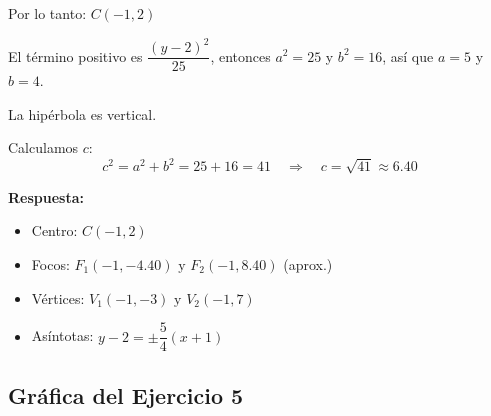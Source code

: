 \documentclass[12pt,a4paper]{article}
\begin{document}
	Por lo tanto: $\boxed{C(-1,2)}$

	\bigskip

	El término positivo es $\dfrac{(y-2)^2}{25}$, entonces $a^2=25$ y $b^2=16$, así que $a=5$ y $b=4$.

	\bigskip

	La hipérbola es vertical.

	\bigskip

	Calculamos $c$:
	\[
	c^2=a^2+b^2=25+16=41 \quad\Rightarrow\quad c=\sqrt{41}\approx 6.40
	\]

	\textbf{Respuesta:}
	\begin{itemize}
		\item Centro: $\boxed{C(-1,2)}$
		\item Focos: $\boxed{F_1(-1,-4.40)\text{ y }F_2(-1,8.40)}$ (aprox.)
		\item Vértices: $\boxed{V_1(-1,-3)\text{ y }V_2(-1,7)}$
		\item Asíntotas: $y-2=\pm\dfrac{5}{4}(x+1)$
	\end{itemize}

	\subsection*{Gráfica del Ejercicio 5}
\end{document}
